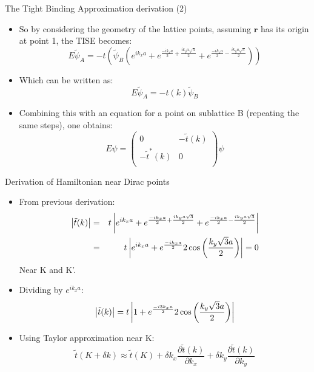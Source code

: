 \documentclass{beamer}
\begin{document}
\begin{frame}[t]{The Tight Binding Approximation derivation (2)}
\begin{itemize}
\item So by considering the geometry of the lattice points, assuming $\mathbf r$ has its origin at point 1, the TISE becomes:
\begin{equation}
E \tilde \psi_A = -t \left ( \tilde \psi_B \left ( e^{ik_x a} + e^{\frac{-ik_x a}{2} + \frac{i k_y a \sqrt{3}}{2}} + e^{\frac{-i k_x a}{2} - \frac{i k_y a \sqrt{3}}{2}} \right ) \right )
\end{equation}
\item Which can be written as:
\begin{equation}
E \tilde \psi_A = -t(k) \tilde \psi_B
\end{equation}
\item Combining this with an equation for a point on sublattice B (repeating the same steps), one obtains:
\begin{equation}
E \psi = \left ( \begin{array}{cc}
0 & -\tilde t(k)\\
-\tilde t^* (k) & 0\\
\end{array} \right ) \psi
\end{equation}
\end{itemize}
\end{frame}

\begin{frame}[t]{Derivation of Hamiltonian near Dirac points}
\begin{itemize}
\item From previous derivation:
\begin{eqnarray*}
\left | \tilde t(k)\right | &=& t\left |  e^{ik_x a} + e^{\frac{-ik_x a}{2} + \frac{i k_y a \sqrt{3}}{2}} + e^{\frac{-i k_x a}{2} - \frac{i k_y a \sqrt{3}}{2}}\right | \\&= &t\left |  e^{ik_x a} + e^{\frac{-ik_x a}{2}} 2\cos\left(\frac{k_y \sqrt{3}a}{2} \right )\right | =0
 \end{eqnarray*}
 Near K and K'.
 \item Dividing by $e^{ik_x a}$:
 \begin{equation}
 \left | \tilde t(k)\right |= t\left |  1 + e^{\frac{-i3k_x a}{2}} 2\cos\left(\frac{k_y \sqrt{3}a}{2} \right )\right | 
 \end{equation}
 \item Using Taylor approximation near K:
 \begin{equation}
 \tilde t(K+\delta k) \approx \tilde t(K) + \delta k_x \frac{\partial \tilde t(k)}{\partial k_x} + \delta k_y \frac{\partial \tilde t(k)}{\partial k_y}
 \end{equation}
\end{itemize}
\end{frame}
\end{document}
